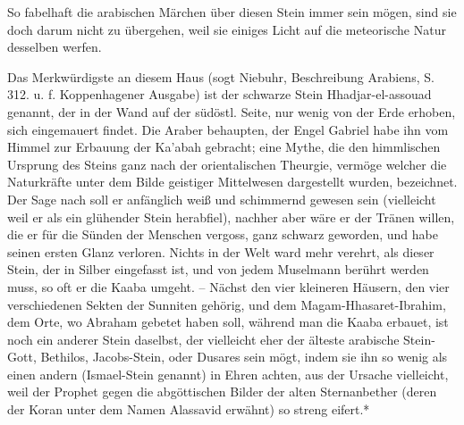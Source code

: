 \documentclass[a4paper, 11pt, oneside, polutonikogreek, german]{article}
\begin{document}
So fabelhaft die arabischen Märchen über diesen Stein immer sein mögen, sind sie doch darum nicht zu übergehen, weil sie einiges Licht auf die meteorische Natur desselben werfen.

Das Merkwürdigste an diesem Haus (sogt Niebuhr, Beschreibung Arabiens, S. 312. u. f. Koppenhagener Ausgabe) ist der schwarze Stein Hhadjar-el-assouad genannt, der in der Wand auf der südöstl. Seite, nur wenig von der Erde erhoben, sich eingemauert findet. Die Araber behaupten, der Engel Gabriel habe ihn vom Himmel zur Erbauung der Ka'abah gebracht; eine Mythe, die den himmlischen Ursprung des Steins ganz nach der orientalischen Theurgie, vermöge welcher die Naturkräfte unter dem Bilde geistiger Mittelwesen dargestellt wurden, bezeichnet. Der Sage nach soll er anfänglich weiß und schimmernd gewesen sein (vielleicht weil er als ein glühender Stein herabfiel), nachher aber wäre er der Tränen willen, die er für die Sünden der Menschen vergoss, ganz schwarz geworden, und habe seinen ersten Glanz verloren. Nichts in der Welt ward mehr verehrt, als dieser Stein, der in Silber eingefasst ist, und von jedem Muselmann berührt werden muss, so oft er die Kaaba umgeht. -- Nächst den vier kleineren Häusern, den vier verschiedenen Sekten der Sunniten gehörig, und dem Magam-Hhasaret-Ibrahim, dem Orte, wo Abraham gebetet haben soll, während man die Kaaba erbauet, ist noch ein anderer Stein daselbst, der vielleicht eher der älteste arabische Stein-Gott, Bethilos, Jacobs-Stein, oder Dusares sein mögt, indem sie ihn so wenig als einen andern (Ismael-Stein genannt) in Ehren achten, aus der Ursache vielleicht, weil der Prophet gegen die abgöttischen Bilder der alten Sternanbether (deren der Koran unter dem Namen Alassavid erwähnt) so streng eifert.*
\end{document}

